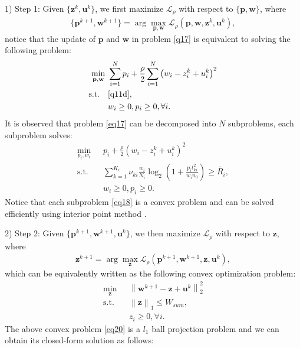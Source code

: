 \documentclass[journal]{IEEEtran}
\begin{document}
1) Step 1: Given $\{\mathbf{z}^k, \mathbf{u}^k\}$, we first maximize $\mathcal{L}_\rho$ with respect to $\{\mathbf{p}, \mathbf{w}\}$, where
\begin{align}
\{\mathbf{p}^{k+1}, \mathbf{w}^{k+1}\} = \arg \max_{\mathbf{p}, \mathbf{w}} \mathcal{L}_\rho\left(\mathbf{p}, \mathbf{w}, \mathbf{z}^k, \mathbf{u}^k\right), \label{q17}
\end{align}
notice that the update of $\mathbf{p}$ and $\mathbf{w}$ in problem \eqref{q17} is equivalent to solving the following problem:
\begin{subequations}\label{eq17}
	\begin{align}
	\min_{\mathbf{p}, \mathbf{w}}\ & \sum\limits_{i = 1}^{N} p_i + \frac{\rho}{2}\sum\limits_{i = 1}^{N}\left(w_i - z_i^k + u_i^k \right)^2  \label{q17a} \\ \mbox{s.t.} \quad &  \eqref{q11d},  \label{q17b} \\
	& w_i\geq 0, p_i \geq 0, \forall i. \label{q17c}
	\end{align}
\end{subequations}
It is observed that problem \eqref{eq17} can be decomposed into $N$ subproblems, each subproblem solves:
\begin{subequations}\label{eq18}
	\begin{align}
	\min_{p_i, w_i}\ & p_i + \frac{\rho}{2}\left(w_i - z_i^k + u_i^k \right)^2  \label{q18a} \\ \mbox{s.t.} \quad & \sum\limits_{k = 1}^{K_i}\nu_{ki}\frac{w_i}{N_i}\log_2\left(1 + \frac{p_it_{ki}^2}{w_in_0}\right) \geq \bar{R}_i,  \label{q18b} \\
	& w_i\geq 0, p_i \geq 0. \label{q18c}
	\end{align}
\end{subequations}
Notice that each subproblem \eqref{eq18} is a convex problem and can be solved efficiently using interior point method \cite{SBoyd3}.

2) Step 2: Given $\{\mathbf{p}^{k+1}, \mathbf{w}^{k+1}, \mathbf{u}^k\}$, we then maximize $\mathcal{L}_\rho$ with respect to $\mathbf{z}$, where
\begin{align}
\mathbf{z}^{k+1} = \arg \max_{\mathbf{z}} \mathcal{L}_\rho\left(\mathbf{p}^{k+1}, \mathbf{w}^{k+1}, \mathbf{z}, \mathbf{u}^k\right),
\end{align} 
which can be equivalently written as the following convex optimization problem: 
\begin{subequations}\label{eq20}
	\begin{align}
	\min_{\mathbf{z}}\ & \left\|\mathbf{w}^{k+1} - \mathbf{z} + \mathbf{u}^k \right\|_2^2 \label{q20a} \\ \mbox{s.t.} \quad & \left\|\mathbf{z} \right\|_1 \leq W_{sum},  \label{q20b} \\
	& z_i\geq 0, \forall i. \label{q20c}
	\end{align}
\end{subequations}
The above convex problem \eqref{eq20} is a  $l_1$ ball projection problem \cite{JDuchi} and we can obtain its closed-form solution as follows:
\end{document}
